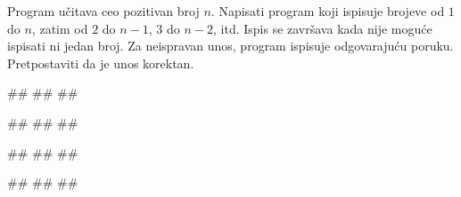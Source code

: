 \begin{Exercise}[difficulty=1, label=1.3_61] 
Program učitava ceo pozitivan broj $n$. Napisati program koji ispisuje
brojeve od $1$ do $n$, zatim od $2$ do $n-1$, $3$ do $n-2$, itd. Ispis
se završava kada nije moguće ispisati ni jedan broj. Za neispravan
unos, program ispisuje odgovarajuću poruku. Pretpostaviti da je unos
korektan.

\begin{miditest}
\begin{upotreba}{1}
#\naslovInt#
##
##
\end{upotreba}
\end{miditest}
\begin{miditest}
\begin{upotreba}{2}
#\naslovInt#
##
##
\end{upotreba}
\end{miditest}

\begin{miditest}
\begin{upotreba}{3}
#\naslovInt#
##
##
\end{upotreba}
\end{miditest}
\begin{miditest}
\begin{upotreba}{4}
#\naslovInt#
##
##
\end{upotreba}
\end{miditest}
\end{Exercise}
\begin{Answer}[ref=1.3_61]
\end{Answer}



